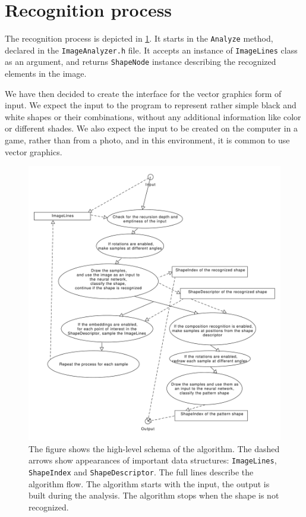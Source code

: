\section{Recognition process}
The recognition process is depicted in \cref{fig:algoschema}. It starts in the \texttt{Analyze} method, declared in the \texttt{ImageAnalyzer.h} file. It accepts an instance of \texttt{ImageLines} class as an argument, and returns \texttt{ShapeNode} instance describing the recognized elements in the image.

We have then decided to create the interface for the vector graphics form of input. We expect the input to the program to represent rather simple black and white shapes or their combinations, without any additional information like color or different shades. We also expect the input to be created on the computer in a game, rather than from a photo, and in this environment, it is common to use vector graphics.

\begin{figure}[p]
\centering
\includegraphics[width=.9\linewidth]{ext/images/algoschema.pdf}
\caption{The figure shows the high-level schema of the algorithm. The dashed arrows show appearances of important data structures: \texttt{ImageLines}, \texttt{ShapeIndex} and \texttt{ShapeDescriptor}. The full lines describe the algorithm flow. The algorithm starts with the input, the output is built during the analysis. The algorithm stops when the shape is not recognized.}
\label{fig:algoschema}
\end{figure}

